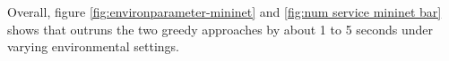 Overall, figure \ref{fig:environparameter-mininet} and \ref{fig:num service mininet bar} shows that \myalgorithm outruns the two greedy approaches by about 1 to 5 seconds under varying environmental settings.





